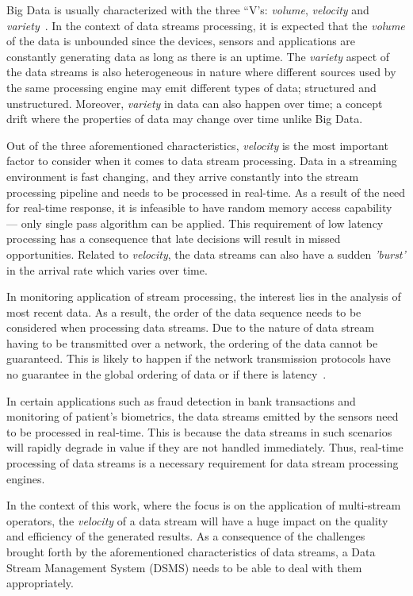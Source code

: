 Big Data is usually characterized with the three “V's: \emph{volume}, \emph{velocity} 
and \emph{variety}~\cite{big_data_analytics}. 
In the context of data streams processing, it is expected that the \emph{volume} of 
the data is unbounded since the devices, sensors and applications are constantly 
generating data as long as there is an uptime. The \emph{variety} aspect of the 
data streams is also heterogeneous in nature where different sources used by the same 
processing engine may emit different types of data; structured and unstructured. 
Moreover, \emph{variety} in data can also happen over time; a concept drift where 
the properties of data may change over time unlike Big Data. 

Out of the three aforementioned characteristics, \emph{velocity} is the most important 
factor to consider when it comes to data stream processing. Data in a streaming 
environment is fast changing, and they arrive constantly into the stream processing
pipeline and needs to be processed in real-time. As a result of the need for real-time 
response, it is infeasible to have random memory access capability --- only single pass algorithm can
be applied. This requirement of low latency processing has a consequence 
that late decisions will result in missed opportunities. Related to \emph{velocity}, 
the data streams can also have a sudden \emph{'burst'} in the arrival rate which varies 
over time. 

In monitoring application of stream processing, the interest lies in the analysis of 
most recent data. As a result, the order of the data sequence needs to be considered 
when processing data streams. Due to the nature of data stream having to be transmitted over a 
network, the ordering of the data cannot be guaranteed. This is 
likely to happen if the network transmission protocols have no guarantee in the global 
ordering of data or if there is latency~\cite{requirements_dsp}. 

In certain applications such as fraud detection in bank transactions and monitoring of 
patient's biometrics, the data streams emitted by the sensors need to be processed in 
real-time. This is because the data streams in such scenarios will rapidly degrade in 
value if they are not handled immediately. Thus, real-time processing of data streams 
is a necessary requirement for data stream processing engines. 

In the context of this work, where the focus is on the application of multi-stream operators, 
the \emph{velocity} of a data stream will have a huge impact on the quality and efficiency of 
the generated results. As a consequence of the challenges brought forth by the 
aforementioned characteristics of data streams, a Data Stream Management System (DSMS) needs 
to be able to deal with them appropriately.  

